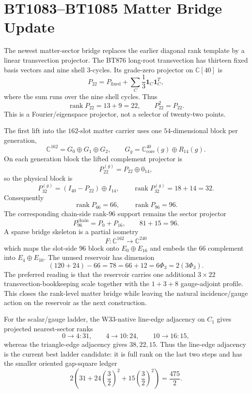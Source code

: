 \section{BT1083--BT1085 Matter Bridge Update}
\label{sec:bt1083-bt1085-matter-bridge}

The newest matter-sector bridge replaces the earlier diagonal rank template by a linear transvection projector.  The BT876 long-root transvection has thirteen fixed basis vectors and nine shell $3$-cycles.  Its grade-zero projector on $\mathbb C[40]$ is
\[
P_{22}=P_{\mathrm{fixed}}+\sum_{C}\frac{1}{3}\mathbf 1_C\mathbf 1_C^{T},
\]
where the sum runs over the nine shell cycles.  Thus
\[
\operatorname{rank}P_{22}=13+9=22,
\qquad
P_{22}^2=P_{22}.
\]
This is a Fourier/eigenspace projector, not a selector of twenty-two points.

The first lift into the $162$-slot matter carrier uses one $54$-dimensional block per generation,
\[
\mathbb C^{162}=G_0\oplus G_1\oplus G_2,
\qquad
G_g=\mathbb C^{40}_{\mathrm{core}}(g)\oplus R_{14}(g).
\]
On each generation block the lifted complement projector is
\[
P_{22}^{(g)}=P_{22}\oplus 0_{14},
\]
so the physical block is
\[
P_{32}^{(g)}=(I_{40}-P_{22})\oplus I_{14},
\qquad
\operatorname{rank}P_{32}^{(g)}=18+14=32.
\]
Consequently
\[
\operatorname{rank}P_{66}=66,
\qquad
\operatorname{rank}P_{96}=96.
\]
The corresponding chain-side rank-$96$ support remains the sector projector
\[
P_{96}^{\mathrm{chain}}=P_0+P_{16},
\qquad
81+15=96.
\]
A sparse bridge skeleton is a partial isometry
\[
F:\mathbb C^{162}\longrightarrow\mathbb C^{240}
\]
which maps the slot-side $96$ block onto $E_0\oplus E_{16}$ and embeds the $66$ complement into $E_4\oplus E_{10}$.  The unused reservoir has dimension
\[
(120+24)-66=78=66+12=6\Phi_3=2(3\Phi_3).
\]
The preferred reading is that the reservoir carries one additional $3\times22$ transvection-bookkeeping scale together with the $1+3+8$ gauge-adjoint profile.  This closes the rank-level matter bridge while leaving the natural incidence/gauge action on the reservoir as the next construction.

For the scalar/gauge ladder, the W33-native line-edge adjacency on $C_1$ gives projected nearest-sector ranks
\[
0\to4:31,\qquad 4\to10:24,\qquad 10\to16:15,
\]
whereas the triangle-edge adjacency gives $38,22,15$.  Thus the line-edge adjacency is the current best ladder candidate: it is full rank on the last two steps and has the smaller oriented gap-square ledger
\[
2\left(31+24\left(\frac32\right)^2+15\left(\frac32\right)^2\right)=\frac{475}{2}.
\]
